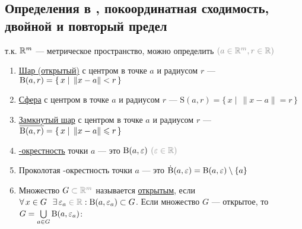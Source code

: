 \subsection{Определения в \rmm, покоординатная сходимость, двойной и повторый предел}

\hangindent=20pt %
т.к. $\mathbb R^m$ --- метрическое пространство, можно определить $\uns{\left(a \in \rmm, r \in \rr\right)}$
\begin{enumerate} %
	\setcounter{enumi}{\value{opr}} %
	\renewcommand{\labelenumi}{\ybox{\sffamily\itshape\theenumi:}} %
	
	\item \href{https://www.youtube.com/live/46TKmI9S1Nw?si=p4w1eFmhpSTJ5deQ&t=6214}{Шар (открытый)} с центром в точке $a$ и радиусом $r$ --- $\mathrm B(a,r) = \{\, x \mid \, \|x - a\| < r \,\}$
	
	\item \href{https://www.youtube.com/live/46TKmI9S1Nw?si=C4Wy0NbbE8qfgqWD&t=6238}{Сфера} с центром в точке $a$ и радиусом $r$ --- $\mathrm S(a, r) = \{\, x \mid \, \|x - a\| = r \,\}$
	
	\item \href{https://www.youtube.com/live/46TKmI9S1Nw?si=Ba0hdH7lY09ipScu&t=6247}{Замкнутый шар} с центром в точке $a$ и радиусом $r$ --- $\overline{\mathrm B(a,r)} = \{\, x \mid \, \|x - a\| \leqslant r \,\}$
	
	\item \href{https://www.youtube.com/live/46TKmI9S1Nw?si=WJ2RP5nsaOw9qmKT&t=6260}{\eps-окрестность} точки $a$ --- это $\mathrm B(a, \varepsilon)$ $\uns{(\eps \in \rr)}$
	
	\item Проколотая \eps-окрестность точки $a$ --- это $\mathrm{\dot B}(a, \varepsilon) = \mathrm B(a, \varepsilon) \setminus \{a\}$
	
	\item Множество $G \uns{{}\subset \rmm}$ называется \href{https://www.youtube.com/live/46TKmI9S1Nw?si=jblKXtIbaiCuIAtQ&t=6281}{открытым}, если $ \A x \in G \E \eps_a \uns{{}\in \rr}: \B{a,\eps_a} \subset G$. Если множество $G$ --- открытое, то $G = \bigcup\limits_{a \in G} \mathrm B(a, \varepsilon_a)$:
	
\end{enumerate}

